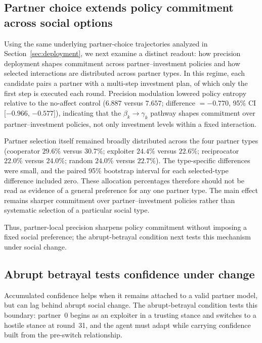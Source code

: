 \subsection{Partner choice extends policy commitment across social options}
\label{sec:partner_choice}

Using the same underlying partner-choice trajectories analyzed in Section~\ref{sec:deployment}, we next examine a distinct readout: how precision deployment shapes commitment across partner--investment policies and how selected interactions are distributed across partner types. In this regime, each candidate pairs a partner with a multi-step investment plan, of which only the first step is executed each round. Precision modulation lowered policy entropy relative to the no-affect control ($6.887$ versus $7.657$; difference $=-0.770$, 95\% CI [$-0.966$, $-0.577$]), indicating that the $\beta_k \rightarrow \gamma_k$ pathway shapes commitment over partner--investment policies, not only investment levels within a fixed interaction.

Partner selection itself remained broadly distributed across the four partner types (cooperator $29.6\%$ versus $30.7\%$; exploiter $24.4\%$ versus $22.6\%$; reciprocator $22.0\%$ versus $24.0\%$; random $24.0\%$ versus $22.7\%$). The type-specific differences were small, and the paired 95\% bootstrap interval for each selected-type difference included zero. These allocation percentages therefore should not be read as evidence of a general preference for any one partner type. The main effect remains sharper commitment over partner--investment policies rather than systematic selection of a particular social type.

Thus, partner-local precision sharpens policy commitment without imposing a fixed social preference; the abrupt-betrayal condition next tests this mechanism under social change.

\subsection{Abrupt betrayal tests confidence under change}
\label{sec:betrayal}

Accumulated confidence helps when it remains attached to a valid partner model, but can lag behind abrupt social change. The abrupt-betrayal condition tests this boundary: partner~0 begins as an exploiter in a trusting stance and switches to a hostile stance at round~31, and the agent must adapt while carrying confidence built from the pre-switch relationship.

